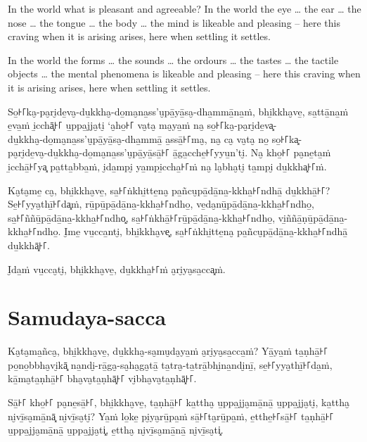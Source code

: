 In the world what is pleasant and agreeable? In the world the eye \ldots{} the
ear \ldots{} the nose \ldots{} the tongue \ldots{} the body \ldots{} the mind is
likeable and pleasing -- here this craving when it is arising arises, here when
settling it settles.

In the world the forms \ldots{} the sounds \ldots{} the ordours \ldots{} the
tastes \ldots{} the tactile objects \ldots{} the mental phenomena is likeable
and pleasing -- here this craving when it is arising arises, here when settling
it settles.

\paliPage

So̱꜔꜒ka̮-pa̮ri̮de̱va̮-du̱kkha̮-do̱ma̮na̱ss'u̮pā̱yā̱sa̮-dha̱mmā̱na̱ṁ, bhi̱kkha̮ve̱, sa̱ttā̱na̱ṁ e̱va̱ṁ i̱cchā͓꜔꜒
u̱ppa̱jja̮ti̮ ‘a̮ho̱꜔꜒ va̮ta̮ ma̮ya̱ṁ na̮ so̱꜔꜒ka̮-pa̮ri̮de̱va͓-\\
du̱kkha̮-do̱ma̮na̱ss'u̮pā̱yā̱sa̮-dha̱mmā̱ a̱ssā̱꜔꜒ma̮, na̮ ca̮ va̮ta̮ no̱ so̱꜔꜒ka͓-\\
pa̮ri̮de̱va̮-du̱kkha̮-do̱ma̮na̱ss'u̮pā̱yā̱sā̱꜔꜒ ā̱ga̱cche̱꜔꜒yyu̱n’ti̮. Na̮ kho̱꜔꜒ pa̮ne̱ta̱ṁ i̱cchā̱꜔꜒ya͓
pa̱tta̱bba̱ṁ, i̮da̱mpi̮ ya̱mpi̱ccha̱꜔꜒ṁ na̮ la̮bha̮ti̮ ta̱mpi̮ du̱kkha͓꜔꜒ṁ.

Ka̮ta̮me̱ ca̮, bhi̱kkha̮ve̱, sa̱꜔꜒ṅkhi̱tte̱na̮ pa̱ñcu̮pā̱dā̱na̱-kkha̱꜔꜒ndhā̱ du̱kkhā̱꜔꜒? Se̱꜔꜒yya̮thī̱꜔꜒da͓ṁ,
rū̱pū̱pā̱dā̱na̱-kkha̱꜔꜒ndho̱, ve̱da̮nū̱pā̱dā̱na̱-kkha̱꜔꜒ndho̱, sa̱꜔꜒ññū̱pā̱dā̱na̱-kkha̱꜔꜒ndho͓,
sa̱꜔꜒ṅkhā̱꜔꜒rū̱pā̱dā̱na̱-kkha̱꜔꜒ndho̱, vi̱ññā̱ṇū̱pā̱dā̱na̱-kkha̱꜔꜒ndho̱. I̮me̱ vu̱cca̱nti̮, bhi̱kkha̮ve͓,
sa̱꜔꜒ṅkhi̱tte̱na̮ pa̱ñcu̮pā̱dā̱na̱-kkha̱꜔꜒ndhā̱ du̱kkhā͓꜔꜒.

I̮da̱ṁ vu̱cca̮ti̮, bhi̱kkha̮ve̱, du̱kkha̱꜔꜒ṁ a̮ri̮ya̮sa̱cca͓ṁ.

\section*{Samudaya-sacca}

Ka̮ta̮ma̱ñca̮, bhi̱kkha̮ve̱, du̱kkha̮-sa̮mu̮da̮ya̱ṁ a̮ri̮ya̮sa̱cca̱ṁ? Yā̱ya̱ṁ ta̱ṇhā̱꜔꜒ po̱no̱bbha̮vi̮kā͓
na̱ndi̮-rā̱ga̮-sa̮ha̮ga̮tā̱ ta̱tra̮-ta̱trā̱bhi̮na̱ndi̮nī̱, se̱꜔꜒yya̮thī̱꜔꜒da̱ṁ, kā̱ma̮ta̱ṇhā̱꜔꜒ bha̮va̮ta̱ṇhā͓꜔꜒
vi̮bha̮va̮ta̱ṇhā͓꜔꜒.

Sā̱꜔꜒ kho̱꜔꜒ pa̮ne̱sā̱꜔꜒, bhi̱kkha̮ve̱, ta̱ṇhā̱꜔꜒ ka̱ttha̮ u̱ppa̱jja̮mā̱nā̱ u̱ppa̱jja̮ti̮, ka̱ttha̮ ni̮vī̱sa̮mā̱nā͓
ni̮vī̱sa̮ti̮? Ya̱ṁ lo̱ke̱ pi̮ya̮rū̱pa̱ṁ sā̱꜔꜒ta̮rū̱pa̱ṁ, e̱tthe̱꜔꜒sā̱꜔꜒ ta̱ṇhā̱꜔꜒ u̱ppa̱jja̮mā̱nā̱ u̱ppa̱jja̮ti͓,
e̱ttha̮ ni̮vī̱sa̮mā̱nā̱ ni̮vī̱sa̮ti͓.

\enlargethispage{\baselineskip}

